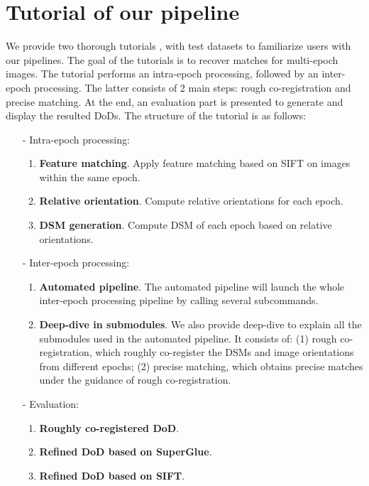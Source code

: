 
\chapter{Tutorial of our pipeline}
\label{chap:appendixC}

We provide two thorough tutorials \cite{tuto-aerial}, \cite{tuto-mixed} with test datasets to familiarize users with our pipelines. 
The goal of the tutorials is to recover matches for multi-epoch images. %
The tutorial performs an intra-epoch processing, followed by an inter-epoch processing. The latter consists of 2 main steps: rough co-registration and precise matching. At the end, an evaluation part is presented to generate and display the resulted \ac{DoD}s.
The structure of the tutorial is as follows:
\begin{itemize}
	\item[-] Intra-epoch processing:
	\begin{enumerate}
		\item \textbf{Feature matching}. Apply feature matching based on SIFT on images within the same epoch.
		\item \textbf{Relative orientation}. Compute relative orientations for each epoch.
		\item \textbf{DSM generation}. Compute \ac{DSM} of each epoch based on relative orientations.
	\end{enumerate}
	\item[-] Inter-epoch processing:
	\begin{enumerate}
		\item \textbf{Automated pipeline}. The automated pipeline will launch the whole inter-epoch processing pipeline by calling several subcommands.
		\item \textbf{Deep-dive in submodules}. We also provide deep-dive to explain all the submodules used in the automated pipeline. It consists of: (1) rough co-registration, which roughly co-register the \ac{DSM}s and image orientations from different epochs; (2) precise matching, which obtains precise matches under the guidance of rough co-registration.
	\end{enumerate}	
	\item[-] Evaluation:
	\begin{enumerate}
	\item \textbf{Roughly co-registered DoD}.
	\item \textbf{Refined DoD based on SuperGlue}.
	\item \textbf{Refined DoD based on SIFT}.
\end{enumerate}	
\end{itemize}

